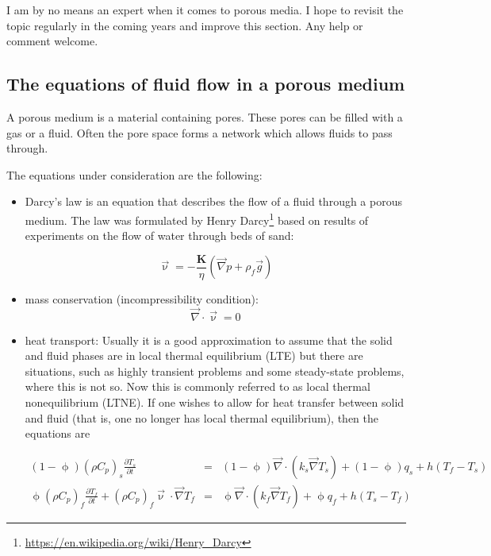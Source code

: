 
{\color{orange} I am by no means an expert when it comes to porous media. I hope to revisit the topic regularly in the coming years and improve this section. Any help or comment welcome.}

\subsection{The equations of fluid flow in a porous medium}

A porous medium is a material containing pores. These pores can 
be filled with a gas or a fluid. Often the pore space forms a network which allows fluids to pass through.

The equations under consideration are the following:
\begin{itemize}
\item Darcy's law is an equation that describes the flow of a fluid through a porous medium. The law was formulated by Henry Darcy\footnote{\url{https://en.wikipedia.org/wiki/Henry_Darcy}}
based on results of experiments on the flow of water through beds of sand:

\begin{equation}
\vec{\upnu} = -\frac{{\bm K}}{\eta} (\vec\nabla p + \rho_f \vec{g})
\label{eq:darcy}
\end{equation}


\item mass conservation (incompressibility condition):
\begin{equation}
\vec\nabla\cdot\vec\upnu = 0
\label{eq:porous:incomp}
\end{equation}
\item heat transport:
Usually it is a good approximation to assume that the solid and fluid phases are in local
thermal equilibrium (LTE) but there are situations, such as highly transient problems and
some steady-state problems, where this is not so. Now this is commonly referred to as local thermal nonequilibrium (LTNE). If one wishes to allow for heat transfer between solid and fluid (that is, one no longer has local thermal equilibrium), then the equations are

\begin{eqnarray}
(1-\upphi)(\rho C_p)_s \frac{\partial T_s}{\partial t}
&=& (1-\upphi) \vec\nabla \cdot (k_s \vec\nabla T_s)
+ (1-\upphi) q_s + h (T_f-T_s) \\
\upphi (\rho C_p)_f  \frac{\partial T_f}{\partial t}
+ (\rho C_p)_f \vec\upnu \cdot \vec\nabla T_f 
&=& \upphi \vec\nabla \cdot (k_f \vec\nabla T_f)
+ \upphi q_f + h (T_s-T_f)
\end{eqnarray}


\end{itemize}
